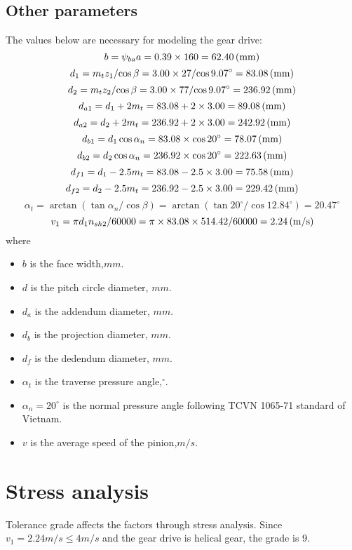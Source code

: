 \subsection{Other parameters}
The values below are necessary for modeling the gear drive:\\
\[ b = \psi_{ba}a = 0.39\times 160= 62.40\, (\mathrm{mm})\]
\[ d_1 = {m_tz_1}/{\cos\beta} = {3.00\times 27}/{\cos9.07^\circ} = 83.08\, (\mathrm{mm})\]
\[ d_2 = {m_tz_2}/{\cos\beta} = {3.00\times 77}/{\cos9.07^\circ} = 236.92\, (\mathrm{mm})\]
\[ d_{a1} = d_1 + 2m_t = 83.08 + 2\times 3.00 = 89.08\, (\mathrm{mm})\]
\[ d_{a2} = d_2 + 2m_t = 236.92 + 2\times 3.00 = 242.92\, (\mathrm{mm})\]
\[ d_{b1} = d_1\cos\alpha_n = 83.08\times \cos 20^\circ = 78.07\, (\mathrm{mm})\]
\[ d_{b2} = d_2\cos\alpha_n = 236.92\times \cos 20^\circ = 222.63 \, (\mathrm{mm})\]
\[ d_{f1} = d_1 - 2.5m_t = 83.08 - 2.5\times 3.00 = 75.58\, (\mathrm{mm})\]
\[ d_{f2} = d_2 - 2.5m_t = 236.92 - 2.5\times 3.00 = 229.42\, (\mathrm{mm})\]
\[ \alpha_t = \arctan\left({\tan\alpha_n}/{\cos\beta}\right) = \arctan\left({\tan 20^\circ}/{\cos 12.84^\circ}\right) = 20.47^\circ\]
\[ v_1 = {\pi d_1n_{sh2}}/{60000} = {\pi \times 83.08 \times 514.42}/{60000} = 2.24\, (\mathrm{m/s})\]
where
\begin{itemize}
	\item $ b $ is the face width,$ \unit{mm} $.
	\item $ d $ is the pitch circle diameter, $ \unit{mm} $.
	\item $ d_a $ is the addendum diameter, $ \unit{mm} $.
	\item $ d_b $ is the projection diameter, $ \unit{mm} $.
	\item $ d_f $ is the dedendum diameter, $ \unit{mm} $.
	\item $ \alpha_t $ is the traverse pressure angle,$ ^\circ $.
	\item $ \alpha_n=20^\circ $ is the normal pressure angle following TCVN 1065-71 standard of Vietnam.
	\item $ v $ is the average speed of the pinion,$ \unit{m/s} $.
\end{itemize}

\section{Stress analysis}
Tolerance grade affects the factors through stress analysis. Since $ v_1=2.24 \unit{m/s} \leq 4 \unit{m/s} $ and the gear drive is helical gear, the grade is 9.
